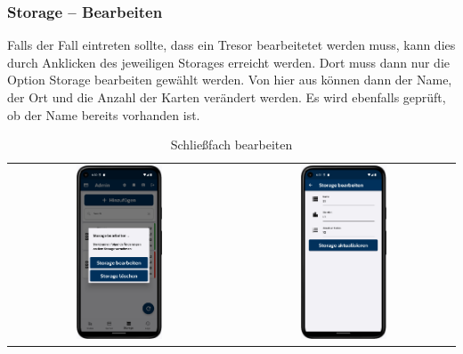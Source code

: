 \newpage

\subsubsection{Storage – Bearbeiten} \label{subsubsec:alterStorage}
Falls der Fall eintreten sollte, dass ein Tresor bearbeitetet werden muss, kann dies durch Anklicken des jeweiligen Storages erreicht werden. Dort muss dann nur die Option Storage bearbeiten gewählt werden. Von hier aus können dann der Name, der Ort und die Anzahl der Karten verändert werden. Es wird ebenfalls geprüft, ob der Name bereits vorhanden ist.

\vspace{1cm}
\begin{table}[htbp]
  \centering
  \begin{tabular}{cc}
    \includegraphics[width=0.4\textwidth]{FLUTTER/images/ZB/storage_page_selector.png} &
    \includegraphics[width=0.4\textwidth]{FLUTTER/images/ZB/storage_alter_page.png} \\
  \end{tabular}
  \label{tab:example}
  \captionsetup{type=figure}
  \caption{Schließfach bearbeiten}
\end{table}

